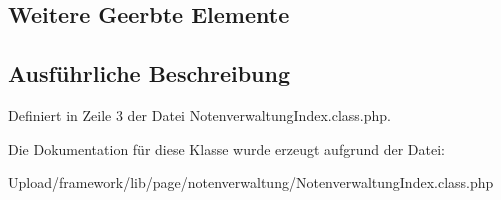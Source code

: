 \subsection*{Weitere Geerbte Elemente}


\subsection{Ausführliche Beschreibung}


Definiert in Zeile 3 der Datei Notenverwaltung\+Index.\+class.\+php.



Die Dokumentation für diese Klasse wurde erzeugt aufgrund der Datei\+:\begin{DoxyCompactItemize}
\item 
Upload/framework/lib/page/notenverwaltung/Notenverwaltung\+Index.\+class.\+php\end{DoxyCompactItemize}
